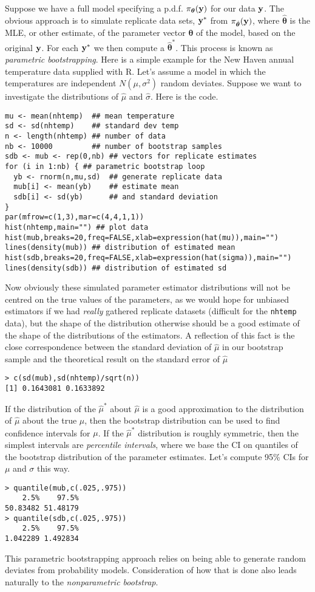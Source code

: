 \documentclass[10pt] {article}
\newcommand{\eps}[3]
{{\begin{center}
 \rotatebox{#1}{\scalebox{#2}{\texttt{[image: \#3]}}}
 \end{center}}
}
\theoremstyle{definition}
\begin{document}
Suppose we have a full model specifying a p.d.f. $\pi_{\bm \theta}({\bf y})$ for our data $\bf y$. The obvious approach is to simulate replicate data sets, ${\bf y}^*$ from $\pi_{\hat {\bm \theta}}({\bf y})$, where $\hat {\bm \theta}$ is the MLE, or other estimate, of the parameter vector $\bm \theta$ of the model, based on the original $\bf y$. For each ${\bf y}^*$ we then compute a $\hat {\bm \theta}^*$. This process is known as {\em parametric bootstrapping}. Here is a simple example for the New Haven annual temperature data supplied with R. Let's assume a model in which the temperatures are independent $N(\mu,\sigma^2)$ random deviates. Suppose we want to investigate the distributions of $\hat \mu$ and $\hat \sigma$. Here is the code.
\begin{lstlisting}
mu <- mean(nhtemp)  ## mean temperature
sd <- sd(nhtemp)    ## standard dev temp
n <- length(nhtemp) ## number of data 
nb <- 10000         ## number of bootstrap samples
sdb <- mub <- rep(0,nb) ## vectors for replicate estimates
for (i in 1:nb) { ## parametric bootstrap loop
  yb <- rnorm(n,mu,sd)  ## generate replicate data
  mub[i] <- mean(yb)    ## estimate mean
  sdb[i] <- sd(yb)      ## and standard deviation
}
par(mfrow=c(1,3),mar=c(4,4,1,1))
hist(nhtemp,main="") ## plot data
hist(mub,breaks=20,freq=FALSE,xlab=expression(hat(mu)),main="")
lines(density(mub)) ## distribution of estimated mean
hist(sdb,breaks=20,freq=FALSE,xlab=expression(hat(sigma)),main="")
lines(density(sdb)) ## distribution of estimated sd
\end{lstlisting}
\eps{-90}{.7}{nht-para-bs.eps} 
Now obviously these simulated parameter estimator distributions will not be centred on the true values of the parameters, as we would hope for unbiased estimators if we had {\em really} gathered replicate datasets (difficult for the {\tt nhtemp} data), but the shape of the distribution otherwise should be a good estimate of the shape of the distributions of the estimators. A reflection of this fact is the close correspondence between the standard deviation of $\hat \mu$ in our bootstrap sample and the theoretical result on the standard error of $\hat \mu$ 
\begin{lstlisting}
> c(sd(mub),sd(nhtemp)/sqrt(n))
[1] 0.1643081 0.1633892
\end{lstlisting}
If the distribution of the $\hat \mu^*$ about $\hat \mu$ is a good approximation to the distribution of $\hat \mu$ about the true $\mu$, then the bootstrap distribution can be used to find confidence intervals for $\mu$. If the $\hat \mu^*$ distribution is roughly symmetric, then the simplest intervals are {\em percentile intervals}, where we base the CI on quantiles of the bootstrap distribution of the parameter estimates. Let's compute 95\% CIs for $\mu $ and $\sigma$ this way.
\begin{lstlisting}
> quantile(mub,c(.025,.975))
    2.5%    97.5% 
50.83482 51.48179 
> quantile(sdb,c(.025,.975))
    2.5%    97.5% 
1.042289 1.492834 
\end{lstlisting}
This parametric bootstrapping approach relies on being able to generate random deviates from probability models. Consideration of how that is done also leads naturally to the  {\em nonparametric bootstrap}.
\end{document}
